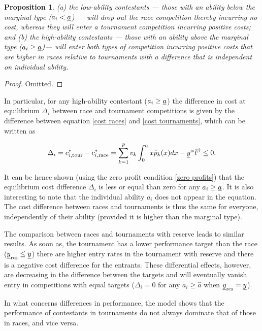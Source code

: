 \documentclass[11pt, titlepage]{article}
\newtheorem{proposition}{Proposition}
\newcommand\deadline{\bar{t}}
\newcommand\target{\underline{y}}
\newcommand\race{\text{race}}
\newcommand\tournament{\text{tour}}
\newcommand\marginaltype{\hat{a}}
\begin{document}
\begin{proposition}
(a) the low-ability contestants --- those with an ability below the marginal type ($a_i<\underline{a}$) --- will drop out the race competition thereby incurring no cost, whereas they will enter a tournament competition incurring positive costs; and (b) the high-ability contestants --- those with an ability above the marginal type ($a_i\geq\underline{a}$)--- will enter both types of competition incurring positive costs that are higher in races relative to tournaments with a difference that is independent on individual ability. 
\end{proposition}

\begin{proof}
Omitted.
\end{proof}

In particular, for any high-ability contestant (\(a_i\geq\underline{a}\))
the difference in cost at equilibrium \(\Delta_i\) between race and
tournament competitions is given by the difference between equation
\eqref{cost races} and \eqref{cost tournaments}, which can be written as

\begin{equation}
    \Delta_i = c_{i,\tournament}^* - c_{i,\race}^* 
    = \sum_{k=1}^{p} v_k \int_0^{\marginal} x \dot p_k(x) d x - \target^\alpha \deadline^\beta \leq 0.
\end{equation}

It can be hence shown (using the zero profit condition
\eqref{zero profits}) that the equilibrium cost difference \(\Delta_i\)
is less or equal than zero for any \(a_i\geq \underline{a}\). It is also
interesting to note that the individual ability \(a_i\) does not appear
in the equation. The cost difference between races and tournaments is
thus the same for everyone, independently of their ability (provided it
is higher than the marginal type).

The comparison between races and tournaments with reserve leads to
similar results. As soon as, the tournament has a lower performance
target than the race (\(\target_{\reserve} \leq \target\)) there are
higher entry rates in the tournament with reserve and there is a
negative cost difference for the entrants. These differential effects,
however, are decreasing in the difference between the targets and will
eventually vanish entry in competitions with equal targets
(\(\Delta_{i}=0\) for any \(a_i\geq\marginaltype\) when
\(\target_{\reserve}=\target\)).

In what concerns differences in performance, the model shows that the
performance of contestants in tournaments do not always dominate that of
those in races, and vice versa.
\end{document}
